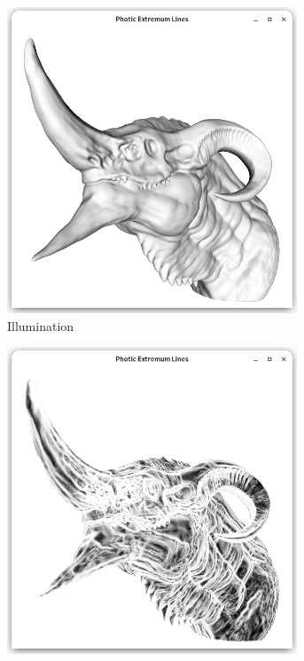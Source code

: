\documentclass[9pt,fleqn,twoside,twocolumn]{stdglobal}
\begin{document}
  \begin{figure}
    \centering
    \begin{subfigure}[b]{0.24\textwidth}
      \centering
      \includegraphics[width=0.95\textwidth,trim={15px 15 15 50},clip]{images/dragon-head-vertex-lighting.png}
      \caption{Illumination}
    \end{subfigure}%
    \hfill%
    \begin{subfigure}[b]{0.24\textwidth}
      \centering
      \includegraphics[width=0.95\textwidth,trim={15px 15 15 50},clip]{images/dragon-head-light-variation.png}

\end{subfigure}
\end{figure}
\end{document}
